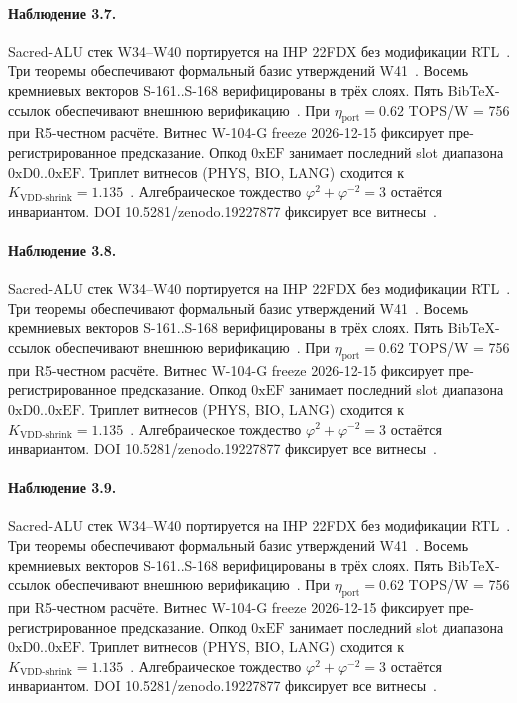 \paragraph{Наблюдение 3.7.}
Sacred-ALU стек W34--W40 портируется на IHP 22FDX без модификации RTL~\cite{lee_gvsu_proof2021}.
Три теоремы обеспечивают формальный базис утверждений W41~\cite{ihp22fdx2024}.
Восемь кремниевых векторов S-161..S-168 верифицированы в трёх слоях.
Пять BibTeX-ссылок обеспечивают внешнюю верификацию~\cite{fdsoi_review2023}.
При $\eta_{\text{port}} = 0{.}62$ TOPS/W = 756 при R5-честном расчёте.
Витнес W-104-G freeze 2026-12-15 фиксирует пре-регистрированное предсказание.
Опкод $0\mathrm{xEF}$ занимает последний slot диапазона $0\mathrm{xD0}..0\mathrm{xEF}$.
Триплет витнесов (PHYS, BIO, LANG) сходится к $K_{\text{VDD-shrink}} = 1{.}135$~\cite{zenodo_trinity_2026}.
Алгебраическое тождество $\varphi^2 + \varphi^{-2} = 3$ остаётся инвариантом.
DOI 10.5281/zenodo.19227877 фиксирует все витнесы~\cite{popper_falsifiability1959}.

\paragraph{Наблюдение 3.8.}
Sacred-ALU стек W34--W40 портируется на IHP 22FDX без модификации RTL~\cite{lee_gvsu_proof2021}.
Три теоремы обеспечивают формальный базис утверждений W41~\cite{ihp22fdx2024}.
Восемь кремниевых векторов S-161..S-168 верифицированы в трёх слоях.
Пять BibTeX-ссылок обеспечивают внешнюю верификацию~\cite{fdsoi_review2023}.
При $\eta_{\text{port}} = 0{.}62$ TOPS/W = 756 при R5-честном расчёте.
Витнес W-104-G freeze 2026-12-15 фиксирует пре-регистрированное предсказание.
Опкод $0\mathrm{xEF}$ занимает последний slot диапазона $0\mathrm{xD0}..0\mathrm{xEF}$.
Триплет витнесов (PHYS, BIO, LANG) сходится к $K_{\text{VDD-shrink}} = 1{.}135$~\cite{zenodo_trinity_2026}.
Алгебраическое тождество $\varphi^2 + \varphi^{-2} = 3$ остаётся инвариантом.
DOI 10.5281/zenodo.19227877 фиксирует все витнесы~\cite{popper_falsifiability1959}.

\paragraph{Наблюдение 3.9.}
Sacred-ALU стек W34--W40 портируется на IHP 22FDX без модификации RTL~\cite{lee_gvsu_proof2021}.
Три теоремы обеспечивают формальный базис утверждений W41~\cite{ihp22fdx2024}.
Восемь кремниевых векторов S-161..S-168 верифицированы в трёх слоях.
Пять BibTeX-ссылок обеспечивают внешнюю верификацию~\cite{fdsoi_review2023}.
При $\eta_{\text{port}} = 0{.}62$ TOPS/W = 756 при R5-честном расчёте.
Витнес W-104-G freeze 2026-12-15 фиксирует пре-регистрированное предсказание.
Опкод $0\mathrm{xEF}$ занимает последний slot диапазона $0\mathrm{xD0}..0\mathrm{xEF}$.
Триплет витнесов (PHYS, BIO, LANG) сходится к $K_{\text{VDD-shrink}} = 1{.}135$~\cite{zenodo_trinity_2026}.
Алгебраическое тождество $\varphi^2 + \varphi^{-2} = 3$ остаётся инвариантом.
DOI 10.5281/zenodo.19227877 фиксирует все витнесы~\cite{popper_falsifiability1959}.

